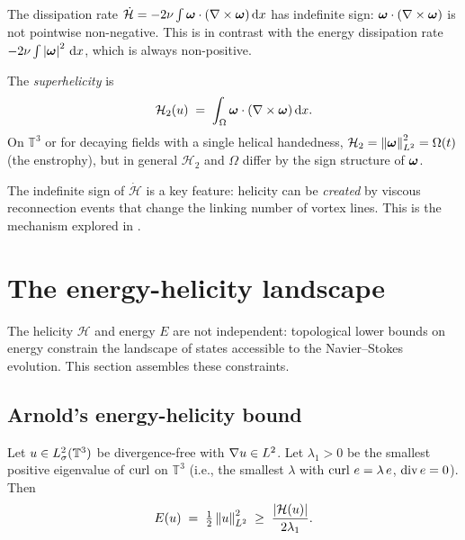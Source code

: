 The dissipation rate $\dot{\mathcal{H}} = -2\nu\int\boldsymbol{\omega}\cdot(\nabla\times\boldsymbol{\omega})\,\mathrm{d} x$
has indefinite sign: $\boldsymbol{\omega}\cdot(\nabla\times\boldsymbol{\omega})$ is not pointwise non-negative.
This is in contrast with the energy dissipation rate $-2\nu\int\left\lvert \boldsymbol{\omega} \right\rvert^2\,\mathrm{d} x$,
which is always non-positive.

\begin{definition}[Superhelicity]\label{def:superhelicity}
  The \emph{superhelicity} is
  \begin{equation}\label{eq:superhelicity}
    \mathcal{H}_2(u) \;=\; \int_\Omega \boldsymbol{\omega}\cdot(\nabla\times\boldsymbol{\omega})\,\mathrm{d} x.
  \end{equation}
  On $\mathbb{T}^3$ or for decaying fields with a single helical handedness,
  $\mathcal{H}_2 = \left\lVert \boldsymbol{\omega} \right\rVert_{L^{2}}^2 = \Omega(t)$ (the enstrophy), but in
  general $\mathcal{H}_2$ and $\Omega$ differ by the sign structure of $\boldsymbol{\omega}$.
\end{definition}

The indefinite sign of $\dot{\mathcal{H}}$ is a key feature: helicity can be
\emph{created} by viscous reconnection events that change the linking number of
vortex lines.  This is the mechanism explored in .

\section{The energy-helicity landscape}\label{sec:det-landscape}

The helicity $\mathcal{H}$ and energy $E$ are not independent: topological
lower bounds on energy constrain the landscape of states accessible to the
Navier--Stokes evolution.  This section assembles these constraints.

\subsection{Arnold's energy-helicity bound}\label{sec:det-arnold-bound}

\begin{theorem}\label{thm:arnold-bound}
  Let $u \in L^{2}_\sigma(\mathbb{T}^3)$ be divergence-free with $\nabla u \in L^{2}$.
  Let $\lambda_1 > 0$ be the smallest positive eigenvalue of $\operatorname{curl}$ on
  $\mathbb{T}^3$ (i.e., the smallest $\lambda$ with $\operatorname{curl}\,e = \lambda\,e$,
  $\operatorname{div} e = 0$).  Then
  \begin{equation}\label{eq:arnold-bound}
    E(u) \;=\; \tfrac{1}{2}\left\lVert u \right\rVert_{L^{2}}^2
    \;\geq\; \frac{\left\lvert \mathcal{H}(u) \right\rvert}{2\lambda_1}.
  \end{equation}
\end{theorem}

